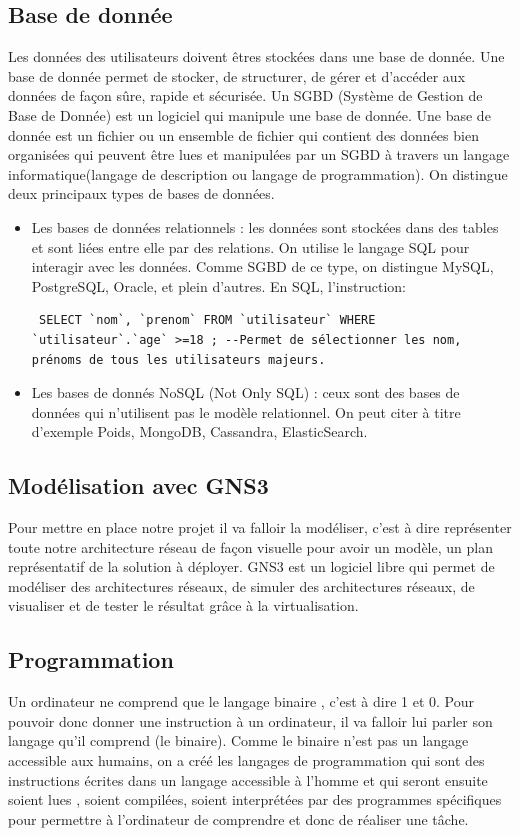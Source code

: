 \documentclass[a4paper,12pt,french]{report} %
\begin{document}
\subsection{Base de donnée}
Les données des utilisateurs doivent êtres stockées dans une base de donnée. Une base de donnée permet de stocker, de structurer, de gérer et d'accéder aux données de façon sûre, rapide et sécurisée. Un SGBD (Système de Gestion de Base de Donnée) est un logiciel qui manipule une base de donnée. Une base de donnée est un fichier ou un ensemble de fichier qui contient des données bien organisées qui peuvent être lues et manipulées par un SGBD à travers un langage informatique(langage de description ou langage de programmation). On distingue deux principaux types de bases de données.
 \begin{itemize}
 \item Les bases de données relationnels : les données sont stockées dans des tables et sont liées entre elle par des relations. On utilise le langage SQL pour interagir avec les données. Comme SGBD de ce type, on distingue MySQL, PostgreSQL, Oracle, et plein d'autres. En SQL, l'instruction: 
 \begin{verbatim}
 SELECT `nom`, `prenom` FROM `utilisateur` WHERE `utilisateur`.`age` >=18 ; --Permet de sélectionner les nom, prénoms de tous les utilisateurs majeurs.
 \end{verbatim}
 \item Les bases de donnés NoSQL (Not Only SQL) : ceux sont des bases de données qui n'utilisent pas le modèle relationnel. On  peut citer à titre d'exemple Poids, MongoDB, Cassandra, ElasticSearch.
 \end{itemize}
 
\subsection{Modélisation avec GNS3}
Pour mettre en place notre projet il va falloir la modéliser, c'est à dire représenter toute notre architecture réseau de façon visuelle pour avoir un modèle, un plan représentatif de la solution à déployer. GNS3 est un logiciel libre qui permet de modéliser des architectures réseaux, de simuler des architectures réseaux, de visualiser et de tester le résultat grâce à la virtualisation.
\subsection{Programmation}
Un ordinateur ne comprend que le langage binaire , c'est à dire  1 et 0. Pour pouvoir donc donner une instruction à un ordinateur, il va falloir lui parler son langage qu'il comprend (le binaire). Comme le binaire n'est pas un langage accessible aux humains, on a créé les langages de programmation qui sont des instructions écrites dans un langage accessible à l'homme et qui seront ensuite soient lues , soient compilées, soient interprétées par des programmes spécifiques pour permettre à l'ordinateur de comprendre et donc de réaliser une tâche.
\end{document}
